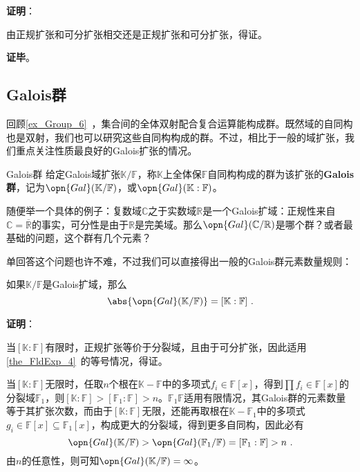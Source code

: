 \textbf{证明}：

由正规扩张和可分扩张相交还是正规扩张和可分扩张，得证。

\textbf{证毕}。



\subsection{Galois群}

回顾\autoref{ex_Group_6}~，集合间的全体双射配合复合运算能构成群。既然域的自同构也是双射，我们也可以研究这些自同构构成的群。不过，相比于一般的域扩张，我们重点关注性质最良好的Galois扩张的情况。

\begin{definition}{Galois群}\label{def_GExt_2}
给定Galois域扩张$\mathbb{K}/\mathbb{F}$，称$\mathbb{K}$上全体保$\mathbb{F}$自同构构成的群为该扩张的\textbf{Galois 群}，记为$\opn{Gal}(\mathbb{K}/\mathbb{F})$，或$\opn{Gal}(\mathbb{K}:\mathbb{F})$。
\end{definition}


随便举一个具体的例子：复数域$\mathbb{C}$之于实数域$\mathbb{R}$是一个Galois扩域：正规性来自$\mathbb{C}=\overline{\mathbb{R}}$的事实，可分性是由于$\mathbb{R}$是完美域。那么$\opn{Gal}(\mathbb{C}/\mathbb{R})$是哪个群？或者最基础的问题，这个群有几个元素？

单回答这个问题也许不难，不过我们可以直接得出一般的Galois群元素数量规则：

\begin{theorem}{}\label{the_GExt_2}
如果$\mathbb{K}/\mathbb{F}$是Galois扩域，那么
\begin{equation}
\abs{\opn{Gal}(\mathbb{K}/\mathbb{F})} = [\mathbb{K}:\mathbb{F}]~.
\end{equation}
\end{theorem}

\textbf{证明}：

当$[\mathbb{K}:\mathbb{F}]$有限时，正规扩张等价于分裂域，且由于可分扩张，因此适用\autoref{the_FldExp_4}~的等号情况，得证。

当$[\mathbb{K}:\mathbb{F}]$无限时，任取$n$个根在$\mathbb{K}-\mathbb{F}$中的多项式$f_i\in\mathbb{F}[x]$，得到$\prod f_i\in\mathbb{F}[x]$的分裂域$\mathbb{F}_1$，则$[\mathbb{K}:\mathbb{F}]>[\mathbb{F}_1:\mathbb{F}]>n$。$\mathbb{F}_1\mathbb{F}$适用有限情况，其Galois群的元素数量等于其扩张次数，而由于$[\mathbb{K}:\mathbb{F}]$无限，还能再取根在$\mathbb{K}-\mathbb{F}_1$中的多项式$g_i\in\mathbb{F}[x]\subseteq \mathbb{F}_1[x]$，构成更大的分裂域，得到更多自同构，因此必有
\begin{equation}
\opn{Gal}(\mathbb{K}/\mathbb{F})>\opn{Gal}(\mathbb{F}_1/\mathbb{F})=[\mathbb{F}_1:\mathbb{F}]>n~.
\end{equation}
由$n$的任意性，则可知$\opn{Gal}(\mathbb{K}/\mathbb{F})=\infty$。

